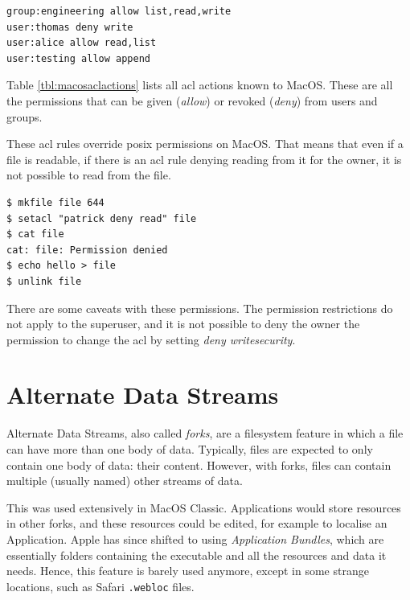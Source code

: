 \documentclass[a4paper]{article}
\begin{document}
\begin{verbatim}
group:engineering allow list,read,write
user:thomas deny write
user:alice allow read,list
user:testing allow append  
\end{verbatim}
Table \ref{tbl:macosaclactions} lists all \gls{acl} actions known to MacOS. These are all the permissions that can be given (\emph{allow}) or revoked (\emph{deny}) from users and groups. 

These \gls{acl} rules override \gls{posix} permissions on MacOS. That means that even if a file is readable, if there is an \gls{acl} rule denying reading from it for the owner, it is not possible to read from the file. 


\begin{verbatim}
$ mkfile file 644
$ setacl "patrick deny read" file
$ cat file
cat: file: Permission denied
$ echo hello > file
$ unlink file
\end{verbatim}
There are some caveats with these permissions. The permission restrictions do not apply to the superuser, and it is not possible to deny the owner the permission to change the \gls{acl} by setting \emph{deny writesecurity}. 




\section{Alternate Data Streams}\label{sec:ads}

Alternate Data Streams, also called \emph{forks}, are a filesystem feature in which a file can have more than one body of data. Typically, files are expected to only contain one body of data: their content. However, with forks, files can contain multiple (usually named) other streams of data. 

This was used extensively in MacOS Classic. Applications would store resources in other forks, and these resources could be edited, for example to localise an Application. Apple has since shifted to using \emph{Application Bundles}, which are essentially folders containing the executable and all the resources and data it needs. Hence, this feature is barely used anymore, except in some strange locations, such as Safari \verb|.webloc| files.
\end{document}
